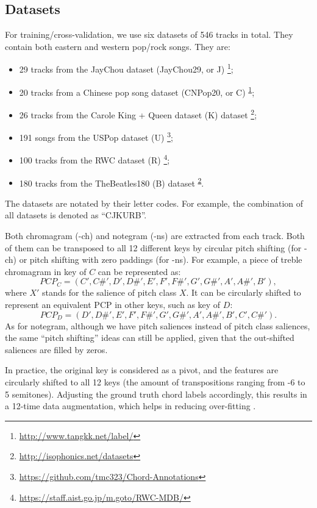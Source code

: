 \subsection{Datasets}

For training/cross-validation, we use six datasets of 546 tracks in total. They contain both eastern and western pop/rock songs. They are:
\begin{itemize}
	\item 29 tracks from the JayChou dataset (JayChou29, or J) \footnote{\url{http://www.tangkk.net/label/}\label{f1}};
	\item 20 tracks from a Chinese pop song dataset (CNPop20, or C) \textsuperscript{\ref{f1}};
	\item 26 tracks from the Carole King + Queen dataset (K) dataset \footnote{\url{http://isophonics.net/datasets}\label{f2}};
	\item 191 songs from the USPop dataset (U) \footnote{\url{https://github.com/tmc323/Chord-Annotations}};
	\item 100 tracks from the RWC dataset (R) \footnote{\url{https://staff.aist.go.jp/m.goto/RWC-MDB/}};
	\item 180 tracks from the TheBeatles180 (B) dataset \textsuperscript{\ref{f2}}. 
\end{itemize}
The datasets are notated by their letter codes. For example, the combination of all datasets is denoted as ``CJKURB''.

Both chromagram (-ch) and notegram (-ns) are extracted from each track. Both of them can be transposed to all 12 different keys by circular pitch shifting (for -ch) or pitch shifting with zero paddings (for -ns). For example, a piece of treble chromagram in key of $C$ can be represented as:
\begin{equation}
PCP_C = (C',C\#', D', D\#', E', F', F\#', G', G\#', A', A\#', B'),
\end{equation}
where $X'$ stands for the salience of pitch class $X$. It can be circularly shifted to represent an equivalent PCP in other keys, such as key of $D$:
\begin{equation}
PCP_D = ( D', D\#', E', F', F\#', G', G\#', A', A\#', B', C',C\#').
\end{equation}
As for notegram, although we have pitch saliences instead of pitch class saliences, the same ``pitch shifting'' ideas can still be applied, given that the out-shifted saliences are filled by zeros.

In practice, the original key is considered as a pivot, and the features are circularly shifted to all 12 keys (the amount of transpositions ranging from -6 to 5 semitones). Adjusting the ground truth chord labels accordingly, this results in a 12-time data augmentation, which helps in reducing over-fitting \cite{cho2014improved,humphrey2015exploration}.

